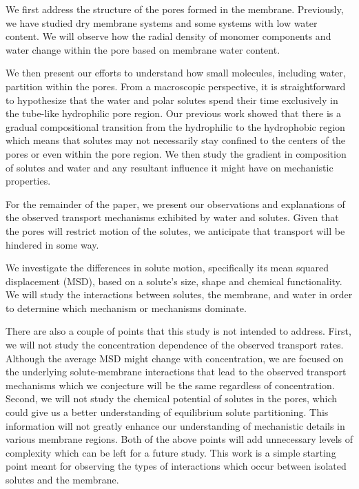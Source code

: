 \documentclass[journal=jpcbfk,manuscript=article]{achemso}
\begin{document}
 
  We first address the structure of the pores formed in the membrane.
  Previously, we have studied dry membrane systems and some systems with 
  low water content. We will observe how the radial density of monomer 
  components and water change within the pore based on membrane water content.
  
  We then present our efforts to understand how small molecules, 
  including water, partition within the pores. From a macroscopic perspective,
  it is straightforward to hypothesize that the water and polar solutes spend
  their time exclusively in the tube-like hydrophilic pore region. Our
  previous work showed that there is a gradual compositional transition from
  the hydrophilic to the hydrophobic region which means that solutes may not
  necessarily stay confined to the centers of the pores or even within the 
  pore region. We then study the gradient in composition of solutes and 
  water and any resultant influence it might have on mechanistic properties.

  For the remainder of the paper, we present our observations 
  and explanations of the observed transport mechanisms exhibited by water
  and solutes. Given that the pores will restrict motion of the solutes, we
  anticipate that transport will be hindered in some way. 

  We investigate the differences in solute motion, specifically its mean 
  squared displacement (MSD), based on a solute's size, shape and chemical
  functionality. We will study the interactions between solutes, the membrane,
  and water in order to determine which mechanism or mechanisms dominate.
  
  There are also a couple of points that this study is not intended to address. 
  First, we will not study the concentration dependence of the observed transport
  rates. Although the average MSD might change with concentration, we are 
  focused on the underlying solute-membrane interactions that lead to the 
  observed transport mechanisms which we conjecture will be the same 
  regardless of concentration. Second, we will not study the chemical potential
  of solutes in the pores, which could give us a better understanding of 
  equilibrium solute partitioning. This information will not greatly enhance our
  understanding of mechanistic details in various membrane regions. Both of the
  above points will add unnecessary levels of complexity which can be left for
  a future study. This work is a simple starting point meant for observing
  the types of interactions which occur between isolated solutes and the
  membrane.
\end{document}
